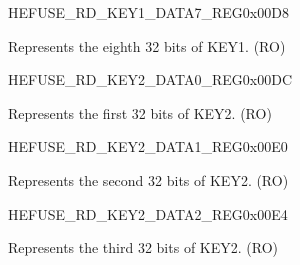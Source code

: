 \begin{register}{H}{EFUSE\_RD\_KEY1\_DATA7\_REG}{0x{}00D8}\label{regdesc:EFUSERDKEY1DATA7REG}
%
\regnewline%
\begin{regdesc}\begin{reglist}
\label{fielddesc:EFUSEKEY1DATA7}\item [EFUSE\_KEY1\_DATA7] Represents the eighth 32 bits of KEY1. (RO)
\end{reglist}\end{regdesc}
\end{register}


\begin{register}{H}{EFUSE\_RD\_KEY2\_DATA0\_REG}{0x{}00DC}\label{regdesc:EFUSERDKEY2DATA0REG}
%
\regnewline%
\begin{regdesc}\begin{reglist}
\label{fielddesc:EFUSEKEY2DATA0}\item [EFUSE\_KEY2\_DATA0] Represents the first 32 bits of KEY2. (RO)
\end{reglist}\end{regdesc}
\end{register}


\begin{register}{H}{EFUSE\_RD\_KEY2\_DATA1\_REG}{0x{}00E0}\label{regdesc:EFUSERDKEY2DATA1REG}
%
\regnewline%
\begin{regdesc}\begin{reglist}
\label{fielddesc:EFUSEKEY2DATA1}\item [EFUSE\_KEY2\_DATA1] Represents the second 32 bits of KEY2. (RO)
\end{reglist}\end{regdesc}
\end{register}


\begin{register}{H}{EFUSE\_RD\_KEY2\_DATA2\_REG}{0x{}00E4}\label{regdesc:EFUSERDKEY2DATA2REG}
%
\regnewline%
\begin{regdesc}\begin{reglist}
\label{fielddesc:EFUSEKEY2DATA2}\item [EFUSE\_KEY2\_DATA2] Represents the third 32 bits of KEY2. (RO)
\end{reglist}\end{regdesc}
\end{register}


